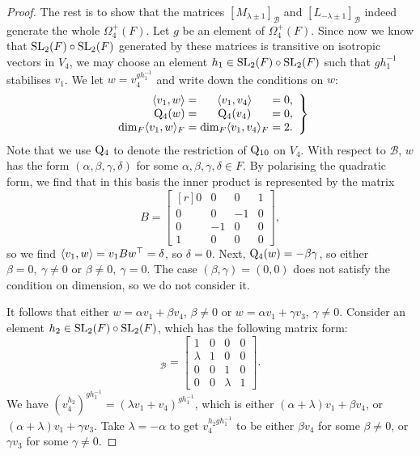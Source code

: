 \begin{proof}
	The rest is to show that the matrices $[M_{\lambda \pm 1}]_{\mathcal{B}}$ and $[L_{- \lambda  \pm 1}]_{\mathcal{B}}$ indeed generate 
	the whole $\Omega_{4}^+(F)$. Let $g$ be an element of $\Omega_4^+(F)$. Since now we know that 
\mbox{$\mathrm{SL}_2(F) \circ \mathrm{SL}_2(F)$} generated by
	these matrices is transitive on isotropic vectors in $V_4$, we may choose an element $h_1 \in \mathrm{SL}_2(F) \circ \mathrm{SL}_2(F)$ such that 
	$g h_1^{-1}$ stabilises $v_1$. We let $w = v_4^{g h_1^{-1}}$ and write down the conditions on $w$:
	\begin{equation*}
		\left.
		\begin{array}{r@{\;}c@{\;}c@{\;}c@{\;}l}
			\inner{v_1}{w} & = & \inner{v_1}{v_4} & = & 0, \\
			\QQ_4(w) & = & \QQ_4(v_4) & = & 0, \\
			\dim_F \inner{v_1}{w}_F & = & \dim_F \inner{v_1}{v_4}_F & = & 2.
		\end{array}
		\right\}
	\end{equation*}
	Note that we use $\mathord{\mathrm{Q}}_4$ to 
	denote the restriction of $\mathord{\mathrm{Q}}_{10}$ on $V_4$. With respect to $\mathcal{B}$, $w$ has the 
	form $(\alpha, \beta, \gamma, \delta)$ for some $\alpha,\beta,\gamma,\delta \in F$.
	By polarising the quadratic form, we find that in this basis the inner product is 
	represented by the matrix
	\begin{equation*}
		B = \begin{bmatrix}[r]
			0 & 0 & 0 & 1 \\
			0 & 0 & -1 & 0 \\
			0 & -1 & 0 & 0 \\
			1 & 0 & 0 & 0
		\end{bmatrix},
	\end{equation*}
	so we find $\langle v_1, w \rangle = v_1 B w^{\top} = \delta$, so $\delta = 0$. Next, 
	\mbox{$\mathord{\mathrm{Q}}_4(w) = -\beta \gamma$}, so either $\beta = 0,\ \gamma \neq 0$ or $\beta \neq 0,\ \gamma = 0$. The 
	case $(\beta, \gamma) = (0,0)$ does not satisfy the condition on dimension, so we do not consider it. 
	
	It follows that either $w = \alpha v_1 + \beta v_4$, $\beta \neq 0$ or $w = \alpha v_1 + \gamma v_3$, $\gamma \neq 0$. 
	Consider an element $h_2 \in \mathrm{SL}_2(F) \circ \mathrm{SL}_2(F)$, which has the following matrix form:
	\begin{equation*}
		[h_2]_{\mathcal{B}} = 
		\begin{bmatrix}
			1 & 0 & 0 & 0 \\
			\lambda & 1 & 0 & 0 \\
			0 & 0 & 1 & 0 \\
			0 & 0 & \lambda & 1
		\end{bmatrix}.
	\end{equation*}
	We have $(v_4^{h_2})^{g h_1^{-1}} = (\lambda v_1 + v_4)^{g h_1^{-1}}$, which is either $(\alpha + \lambda) v_1 + \beta v_4$, or 
	$(\alpha + \lambda) v_1 + \gamma v_3$. Take $\lambda = -\alpha$ to get $v_4^{h_2 g h_1^{-1}}$ to be either 
	$\beta v_4$ for some $\beta \neq 0$, or $\gamma v_3$ for some $\gamma \neq 0$. 
	

\end{proof}
